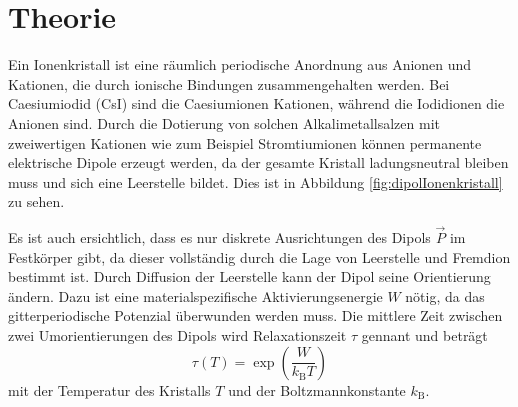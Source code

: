 \section{Theorie}
\label{sec:Theorie}

Ein Ionenkristall ist eine räumlich periodische Anordnung aus Anionen und Kationen, die durch ionische Bindungen zusammengehalten werden. Bei Caesiumiodid (CsI) sind die Caesiumionen  Kationen, während die Iodidionen  die Anionen sind.
Durch die Dotierung von solchen Alkalimetallsalzen mit zweiwertigen Kationen wie zum Beispiel Stromtiumionen  können permanente elektrische Dipole erzeugt werden, da der gesamte Kristall ladungsneutral bleiben muss und sich eine Leerstelle bildet. Dies ist in Abbildung \ref{fig:dipolIonenkristall} zu sehen.

Es ist auch ersichtlich, dass es nur diskrete Ausrichtungen des Dipols $\vec{P}$ im Festkörper gibt, da dieser vollständig durch die Lage von Leerstelle und Fremdion bestimmt ist. Durch Diffusion der Leerstelle kann der Dipol seine Orientierung ändern. Dazu ist eine materialspezifische Aktivierungsenergie $W$ nötig, da das gitterperiodische Potenzial überwunden werden muss. Die mittlere Zeit zwischen zwei Umorientierungen des Dipols wird Relaxationszeit $\tau$ gennant und beträgt
\begin{equation}
  \tau(T) = \exp(\frac{W}{k_{\text{B}}T})
  \label{eqn:relaxtime}
\end{equation}
mit der Temperatur des Kristalls $T$ und der Boltzmannkonstante $k_{\text{B}}$.
